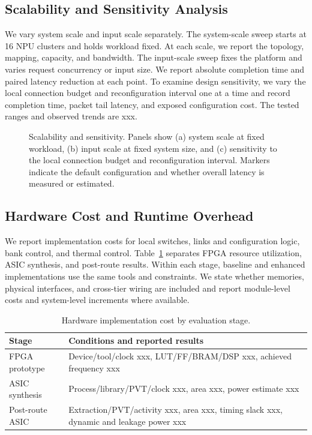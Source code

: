 \documentclass[conference,10pt]{IEEEtran}
\newcommand{\Description}[1]{}
\begin{document}
\subsection{Scalability and Sensitivity Analysis}

We vary system scale and input scale separately. The system-scale sweep starts at 16 NPU clusters and holds workload fixed. At each scale, we report the topology, mapping, capacity, and bandwidth. The input-scale sweep fixes the platform and varies request concurrency or input size. We report absolute completion time and paired latency reduction at each point. To examine design sensitivity, we vary the local connection budget and reconfiguration interval one at a time and record completion time, packet tail latency, and exposed configuration cost. The tested ranges and observed trends are xxx.

\begin{figure}[t]
\centering
\fbox{\rule{0pt}{17mm}\rule{0.90\columnwidth}{0pt}}
\caption{Scalability and sensitivity. Panels show (a) system scale at fixed workload, (b) input scale at fixed system size, and (c) sensitivity to the local connection budget and reconfiguration interval. Markers indicate the default configuration and whether overall latency is measured or estimated.}
\Description{Reserved space for the scalability and parameter sweeps.}
\label{fig:eval-scale}
\end{figure}

\subsection{Hardware Cost and Runtime Overhead}

We report implementation costs for local switches, links and configuration logic, bank control, and thermal control. Table~\ref{tab:eval-cost} separates FPGA resource utilization, ASIC synthesis, and post-route results. Within each stage, baseline and enhanced implementations use the same tools and constraints. We state whether memories, physical interfaces, and cross-tier wiring are included and report module-level costs and system-level increments where available.

\begin{table}[t]
\caption{Hardware implementation cost by evaluation stage.}
\label{tab:eval-cost}
\centering\small
\begin{tabular}{@{}lp{}@{}}
\hline
Stage & Conditions and reported results \\
\hline
FPGA prototype & Device/tool/clock xxx, LUT/FF/BRAM/DSP xxx, achieved frequency xxx \\
ASIC synthesis & Process/library/PVT/clock xxx, area xxx, power estimate xxx \\
Post-route ASIC & Extraction/PVT/activity xxx, area xxx, timing slack xxx, dynamic and leakage power xxx \\
\hline
\end{tabular}
\end{table}
\end{document}
